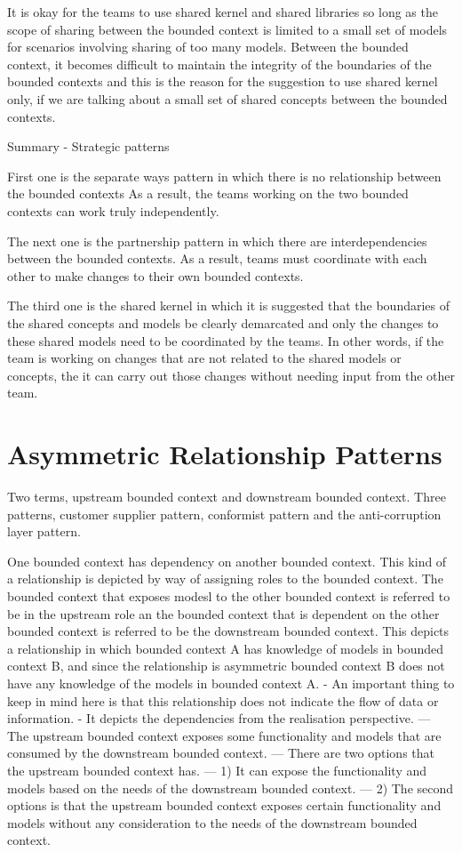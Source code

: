 It is okay for the teams to use shared kernel and shared libraries so long as the scope of sharing between the bounded context is limited to a small set of models for scenarios involving sharing of too many models.
Between the bounded context, it becomes difficult to maintain the integrity of the boundaries of the bounded contexts and this is the reason for the suggestion to use shared kernel only, if we are talking about a small set of shared concepts between the bounded contexts.

Summary - Strategic patterns

First one is the separate ways pattern in which there is no relationship between the bounded contexts
As a result, the teams working on the two bounded contexts can work truly independently.

The next one is the partnership pattern in which there are interdependencies between the bounded contexts.
As a result, teams must coordinate with each other to make changes to their own bounded contexts.

The third one is the shared kernel in which it is suggested that the boundaries of the shared concepts and models be clearly demarcated and only the changes to these shared models need to be coordinated by the teams.
In other words, if the team is working on changes that are not related to the shared models or concepts, the it can carry out those changes without needing input from the other team.


\section{Asymmetric Relationship Patterns}

Two terms, upstream bounded context and downstream bounded context.
Three patterns, customer supplier pattern, conformist pattern and the anti-corruption layer pattern.

One bounded context has dependency on another bounded context.
This kind of a relationship is depicted by way of assigning roles to the bounded context.
The bounded context that exposes modesl to the other bounded context is referred to be in the upstream role an the bounded context that is dependent on the other bounded context is referred to be the downstream bounded context.
This depicts a relationship in which bounded context A has knowledge of models in bounded context B, and since the relationship is asymmetric bounded context B does not have any knowledge of the models in bounded context A.
- An important thing to keep in mind here is that this relationship does not indicate the flow of data or information.
- It depicts the dependencies from the realisation perspective.
--- The upstream bounded context exposes some functionality and models that are consumed by the downstream bounded context.
--- There are two options that the upstream bounded context has.
--- 1) It can expose the functionality and models based on the needs of the downstream bounded context.
--- 2) The second options is that the upstream bounded context exposes certain functionality and models without any consideration to the needs of the downstream bounded context.

